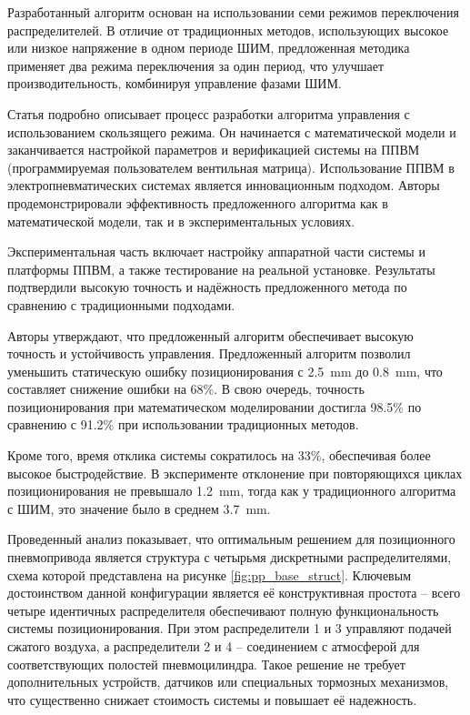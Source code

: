 Разработанный алгоритм основан на использовании семи режимов переключения распределителей. В отличие от традиционных методов,
использующих высокое или низкое напряжение в одном периоде ШИМ, предложенная методика применяет два режима переключения за один период,
что улучшает производительность, комбинируя управление фазами ШИМ.

Статья подробно описывает процесс разработки алгоритма управления с использованием скользящего режима.
Он начинается с математической модели и заканчивается настройкой параметров и верификацией системы на ППВМ (программируемая пользователем
вентильная матрица).
Использование ППВМ в электропневматических системах является инновационным подходом. Авторы продемонстрировали эффективность
предложенного алгоритма как в математической модели, так и в экспериментальных условиях.

Экспериментальная часть включает настройку аппаратной части системы и платформы ППВМ, а также тестирование на реальной установке.
Результаты подтвердили высокую точность и надёжность предложенного метода по сравнению с традиционными подходами.

Авторы утверждают, что предложенный алгоритм обеспечивает высокую точность и устойчивость управления.
Предложенный алгоритм позволил уменьшить статическую ошибку позиционирования с \num{2.5}~\si{\milli\metre} до \num{0.8}~\si{\milli\metre},
что составляет снижение ошибки на \num{68}\%.
В свою очередь, точность позиционирования при математическом моделировании достигла \num{98.5}\% по сравнению с \num{91.2}\% при
использовании традиционных методов.

Кроме того, время отклика системы сократилось на 33\%, обеспечивая более высокое быстродействие. В
эксперименте отклонение при повторяющихся циклах позиционирования не превышало \num{1.2}~\si{\milli\metre}, тогда как
у традиционного алгоритма с ШИМ, это значение было в среднем \num{3.7}~\si{\milli\metre}.

Проведенный анализ показывает, что оптимальным решением для позиционного пневмопривода является структура с четырьмя
дискретными распределителями, схема которой представлена на рисунке \ref*{fig:pp_base_struct}.
Ключевым достоинством данной конфигурации является её конструктивная простота -- всего четыре идентичных распределителя
обеспечивают полную функциональность системы позиционирования. При этом распределители 1 и 3 управляют подачей сжатого воздуха,
а распределители 2 и 4 -- соединением с атмосферой для соответствующих полостей пневмоцилиндра. Такое решение не
требует дополнительных устройств, датчиков или специальных тормозных механизмов, что существенно
снижает стоимость системы и повышает её надежность.

